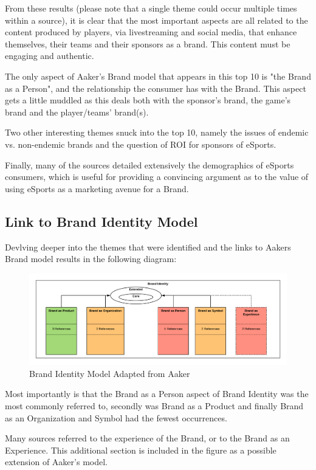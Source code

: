 \documentclass[10pt,twoside]{article}
\begin{document}
From these results (please note that a single theme could occur multiple times within a source), it is clear that the most important aspects are all related to the content produced by players, via livestreaming and social media, that enhance themselves, their teams and their sponsors as a brand. This content must be engaging and authentic.

The only aspect of Aaker's Brand model that appears in this top 10 is "the Brand as a Person", and the relationship the consumer has with the Brand. This aspect gets a little muddled as this deals both with the sponsor's brand, the game's brand and the player/teams' brand(s).

Two other interesting themes snuck into the top 10, namely the issues of endemic vs. non-endemic brands and the question of ROI for sponsors of eSports.

Finally, many of the sources detailed extensively the demographics of eSports consumers, which is useful for providing a convincing argument as to the value of using eSports as a marketing avenue for a Brand.

\subsection{Link to Brand Identity Model}

Devlving deeper into the themes that were identified and the links to Aakers Brand model results in the following diagram:

\begin{figure}[h]
\caption{Brand Identity Model Adapted from Aaker}
\centering
\includegraphics[width=1\textwidth]{BrandIdentityModelUpdated.png}
\end{figure}

Most importantly is that the Brand as a Person aspect of Brand Identity was the most commonly referred to, secondly was Brand as a Product and finally Brand as an Organization and Symbol had the fewest occurrences.

Many sources referred to the experience of the Brand, or to the Brand as an Experience. This additional section is included in the figure as a possible extension of Aaker's model.
\end{document}
